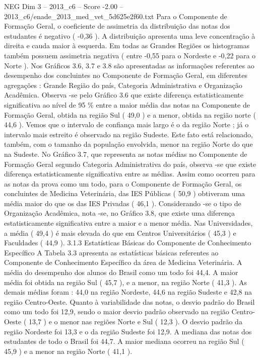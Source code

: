 \begin{textsample}{NEG Dim 3 – 2013\_c6 – Score -2.00 – 2013\_c6/enade\_2013\_med\_vet\_5d625e2f60.txt}
Para o Componente de Formação Geral, o coeficiente de assimetria da distribuição das notas dos estudantes é negativo ( -0,36 ).
A distribuição apresenta uma leve concentração à direita e cauda maior à esquerda.
Em todas as Grandes Regiões os histogramas também possuem assimetria negativa ( entre -0,55 para o Nordeste e -0,22 para o Norte ).
Nos Gráficos 3.6, 3.7 e 3.8 são apresentadas as informações referentes ao desempenho dos concluintes no Componente de Formação Geral, em diferentes agregações : Grande Região do país, Categoria Administrativa e Organização Acadêmica.
Observa -se pelo Gráfico 3.6 que existe diferença estatisticamente significativa ao nível de 95 \% entre a maior média das notas na Componente de Formação Geral, obtida na região Sul ( 49,0 ) e a menor, obtida na região norte ( 44,6 ).
Vemos que o intervalo de confiança mais largo é o da região Norte ; já o intervalo mais estreito é observado na região Sudeste.
Este fato está relacionado, também, com o tamanho da população envolvida, menor na região Norte do que na Sudeste.
No Gráfico 3.7, que representa as notas médias no Componente de Formação Geral segundo Categoria Administrativa do país, observa -se que existe diferença estatisticamente significativa entre as médias.
Assim como ocorreu para as notas da prova como um todo, para o Componente de Formação Geral, os concluintes de Medicina Veterinária, das IES Públicas ( 50,9 ) obtiveram uma média maior do que os das IES Privadas ( 46,1 ).
Considerando -se o tipo de Organização Acadêmica, nota -se, no Gráfico 3.8, que existe uma diferença estatisticamente significativa entre a maior e a menor média.
Nas Universidades, a média ( 49,4 ) é mais elevada do que em Centros Universitários ( 45,3 ) e Faculdades ( 44,9 ). 3.1.3 Estatísticas Básicas do Componente de Conhecimento Específico A Tabela 3.3 apresenta as estatísticas básicas referentes ao Componente de Conhecimento Específico da área de Medicina Veterinária.
A média do desempenho dos alunos do Brasil como um todo foi 44,4.
A maior média foi obtida na região Sul ( 45,7 ), e a menor, na região Norte ( 41,3 ).
As demais médias foram : 44,0 na região Nordeste, 44,6 na região Sudeste e 42,8 na região Centro-Oeste.
Quanto à variabilidade das notas, o desvio padrão do Brasil como um todo foi 12,9, sendo o maior desvio padrão observado na região Centro-Oeste ( 13,7 ) e o menor nas regiões Norte e Sul ( 12,3 ).
O desvio padrão da região Nordeste foi 13,3 e o da região Sudeste foi 12,9.
A mediana das notas dos estudantes de todo o Brasil foi 44,7.
A maior mediana ocorreu na região Sul ( 45,9 ) e a menor na região Norte ( 41,1 ).

\end{textsample}
